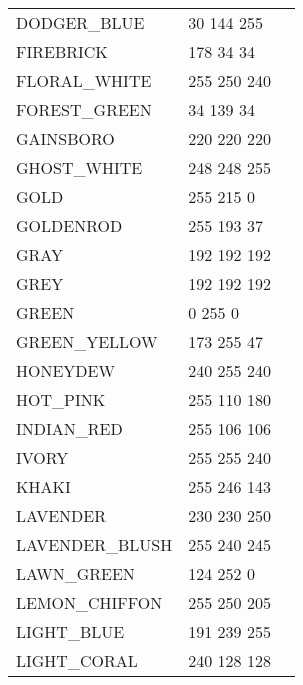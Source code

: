 \begin{longtable}{l|l|l}
DODGER\_BLUE & 30 144 255 & \colorbox[RGB]{30 144 255}{\phantom{MMMMMMMM}}\\
FIREBRICK & 178 34 34 & \colorbox[RGB]{178 34 34}{\phantom{MMMMMMMM}}\\
FLORAL\_WHITE & 255 250 240 & \colorbox[RGB]{255 250 240}{\phantom{MMMMMMMM}}\\
FOREST\_GREEN & 34 139 34 & \colorbox[RGB]{34 139 34}{\phantom{MMMMMMMM}}\\
GAINSBORO & 220 220 220 & \colorbox[RGB]{220 220 220}{\phantom{MMMMMMMM}}\\
GHOST\_WHITE & 248 248 255 & \colorbox[RGB]{248 248 255}{\phantom{MMMMMMMM}}\\
GOLD & 255 215 0 & \colorbox[RGB]{255 215 0}{\phantom{MMMMMMMM}}\\
GOLDENROD & 255 193 37 & \colorbox[RGB]{255 193 37}{\phantom{MMMMMMMM}}\\
GRAY & 192 192 192 & \colorbox[RGB]{192 192 192}{\phantom{MMMMMMMM}}\\
GREY & 192 192 192 & \colorbox[RGB]{192 192 192}{\phantom{MMMMMMMM}}\\
GREEN & 0 255 0 & \colorbox[RGB]{0 255 0}{\phantom{MMMMMMMM}}\\
GREEN\_YELLOW & 173 255 47 & \colorbox[RGB]{173 255 47}{\phantom{MMMMMMMM}}\\
HONEYDEW & 240 255 240 & \colorbox[RGB]{240 255 240}{\phantom{MMMMMMMM}}\\
HOT\_PINK & 255 110 180 & \colorbox[RGB]{255 110 180}{\phantom{MMMMMMMM}}\\
INDIAN\_RED & 255 106 106 & \colorbox[RGB]{255 106 106}{\phantom{MMMMMMMM}}\\
IVORY & 255 255 240 & \colorbox[RGB]{255 255 240}{\phantom{MMMMMMMM}}\\
KHAKI & 255 246 143 & \colorbox[RGB]{255 246 143}{\phantom{MMMMMMMM}}\\
LAVENDER & 230 230 250 & \colorbox[RGB]{230 230 250}{\phantom{MMMMMMMM}}\\
LAVENDER\_BLUSH & 255 240 245 & \colorbox[RGB]{255 240 245}{\phantom{MMMMMMMM}}\\
LAWN\_GREEN & 124 252 0 & \colorbox[RGB]{124 252 0}{\phantom{MMMMMMMM}}\\
LEMON\_CHIFFON & 255 250 205 & \colorbox[RGB]{255 250 205}{\phantom{MMMMMMMM}}\\
LIGHT\_BLUE & 191 239 255 & \colorbox[RGB]{191 239 255}{\phantom{MMMMMMMM}}\\
LIGHT\_CORAL & 240 128 128 & \colorbox[RGB]{240 128 128}{\phantom{MMMMMMMM}}\\

\end{longtable}
